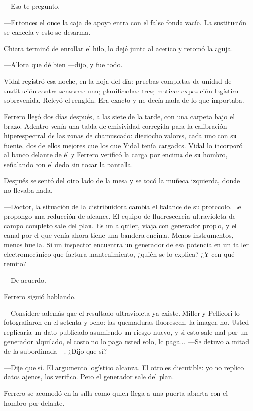 ---Eso te pregunto.

---Entonces el once la caja de apoyo entra con el falso fondo vacío. La sustitución se cancela y esto se desarma.

Chiara terminó de enrollar el hilo, lo dejó junto al acerico y retomó la aguja.

---Allora que dé bien ---dijo, y fue todo.

Vidal registró esa noche, en la hoja del día: pruebas completas de unidad de sustitución contra sensores: una; planificadas: tres; motivo: exposición logística sobrevenida. Releyó el renglón. Era exacto y no decía nada de lo que importaba.

Ferrero llegó dos días después, a las siete de la tarde, con una carpeta bajo el brazo. Adentro venía una tabla de emisividad corregida para la calibración hiperespectral de las zonas de chamuscado: dieciocho valores, cada uno con su fuente, dos de ellos mejores que los que Vidal tenía cargados. Vidal lo incorporó al banco delante de él y Ferrero verificó la carga por encima de su hombro, señalando con el dedo sin tocar la pantalla.

Después se sentó del otro lado de la mesa y se tocó la muñeca izquierda, donde no llevaba nada.

---Doctor, la situación de la distribuidora cambia el balance de su protocolo. Le propongo una reducción de alcance. El equipo de fluorescencia ultravioleta de campo completo sale del plan. Es un alquiler, viaja con generador propio, y el canal por el que venía ahora tiene una bandera encima. Menos instrumentos, menos huella. Si un inspector encuentra un generador de esa potencia en un taller electromecánico que factura mantenimiento, ¿quién se lo explica? ¿Y con qué remito?

---De acuerdo.

Ferrero siguió hablando.

---Considere además que el resultado ultravioleta ya existe. Miller y Pellicori lo fotografiaron en el setenta y ocho: las quemaduras fluorescen, la imagen no. Usted replicaría un dato publicado asumiendo un riesgo nuevo, y si esto sale mal por un generador alquilado, el costo no lo paga usted solo, lo paga... ---Se detuvo a mitad de la subordinada---. ¿Dijo que sí?

---Dije que sí. El argumento logístico alcanza. El otro es discutible: yo no replico datos ajenos, los verifico. Pero el generador sale del plan.

Ferrero se acomodó en la silla como quien llega a una puerta abierta con el hombro por delante.

